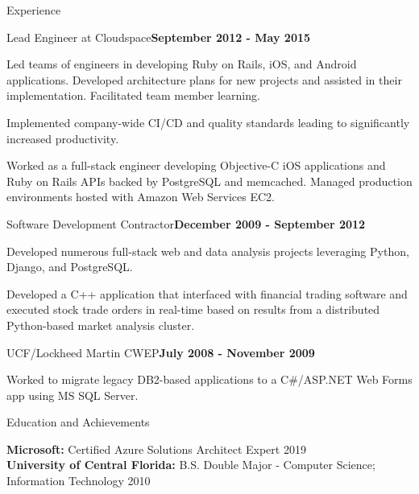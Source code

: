 \documentclass{resume} %
\begin{document}
\begin{rSection}{Experience}

\begin{rSubsection}{Lead Engineer at Cloudspace}{\bf September 2012 - May 2015}{}{}

\item Led teams of engineers in developing Ruby on Rails, iOS, and Android applications.  Developed architecture plans for new projects and assisted in their implementation. Facilitated team member learning.
\item Implemented company-wide CI/CD and quality standards leading to significantly increased productivity.
\item Worked as a full-stack engineer developing Objective-C iOS applications and Ruby on Rails APIs backed by PostgreSQL and memcached. Managed production environments hosted with Amazon Web Services EC2.

\end{rSubsection}


\begin{rSubsection}{Software Development Contractor}{\bf December 2009 - September 2012}{}{}

\item Developed numerous full-stack web and data analysis projects leveraging Python, Django, and PostgreSQL.
\item Developed a C++ application that interfaced with financial trading software and executed stock trade orders in real-time based on results from a distributed Python-based market analysis cluster.

\end{rSubsection}


\begin{rSubsection}{UCF/Lockheed Martin CWEP}{\bf July 2008 - November 2009}{}{}

\item Worked to migrate legacy DB2-based applications to a C\#/ASP.NET Web Forms app using MS SQL Server.

\end{rSubsection}


\end{rSection}


\begin{rSection}{Education and Achievements}

{\bf Microsoft: } Certified Azure Solutions Architect Expert \hfill 2019 \\ 
{\bf University of Central Florida:} B.S. Double Major - Computer Science; Information Technology  \hfill 2010 \\ 
\end{rSection}
\end{document}
